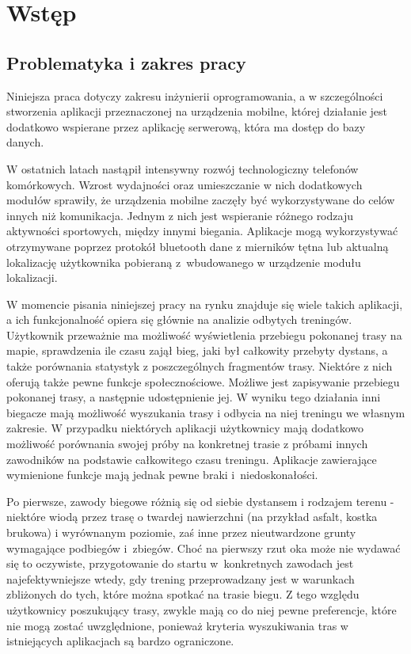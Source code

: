 \chapter{Wstęp}\label{chap:introduction}

\section{Problematyka i zakres pracy}
Niniejsza praca dotyczy zakresu inżynierii oprogramowania, a w szczególności stworzenia aplikacji przeznaczonej na urządzenia mobilne, której działanie jest dodatkowo wspierane przez aplikację serwerową, która ma dostęp do bazy danych.

W ostatnich latach nastąpił intensywny rozwój technologiczny telefonów komórkowych. Wzrost wydajności oraz umieszczanie w nich dodatkowych modułów sprawiły, że urządzenia mobilne zaczęły być wykorzystywane do celów innych niż komunikacja. Jednym z nich jest wspieranie różnego rodzaju aktywności sportowych, między innymi biegania. Aplikacje mogą wykorzystywać otrzymywane poprzez protokół bluetooth dane z mierników tętna lub aktualną lokalizację użytkownika pobieraną z~wbudowanego w urządzenie modułu lokalizacji.

W momencie pisania niniejszej pracy na rynku znajduje się wiele takich aplikacji, a ich funkcjonalność opiera się głównie na analizie odbytych treningów. Użytkownik przeważnie ma możliwość wyświetlenia przebiegu pokonanej trasy na mapie, sprawdzenia ile czasu zajął bieg, jaki był całkowity przebyty dystans, a także porównania statystyk z poszczególnych fragmentów trasy. Niektóre z nich oferują także pewne funkcje społecznościowe. Możliwe jest zapisywanie przebiegu pokonanej trasy, a następnie udostępnienie jej. W wyniku tego działania inni biegacze mają możliwość wyszukania trasy i odbycia na niej treningu we własnym zakresie. W przypadku niektórych aplikacji użytkownicy mają dodatkowo możliwość porównania swojej próby na konkretnej trasie z próbami innych zawodników na podstawie całkowitego czasu treningu. Aplikacje zawierające wymienione funkcje mają jednak pewne braki i~niedoskonałości.

Po pierwsze, zawody biegowe różnią się od siebie dystansem i rodzajem terenu - niektóre wiodą przez trasę o twardej nawierzchni (na przykład asfalt, kostka brukowa) i wyrównanym poziomie, zaś inne przez nieutwardzone grunty wymagające podbiegów i~zbiegów. Choć na pierwszy rzut oka może nie wydawać się to oczywiste, przygotowanie do startu w~konkretnych zawodach jest najefektywniejsze wtedy, gdy trening przeprowadzany jest w warunkach zbliżonych do tych, które można spotkać na trasie biegu. Z tego względu użytkownicy poszukujący trasy, zwykle mają co do niej pewne preferencje, które nie mogą zostać uwzględnione, ponieważ kryteria wyszukiwania tras w istniejących aplikacjach są bardzo ograniczone.

